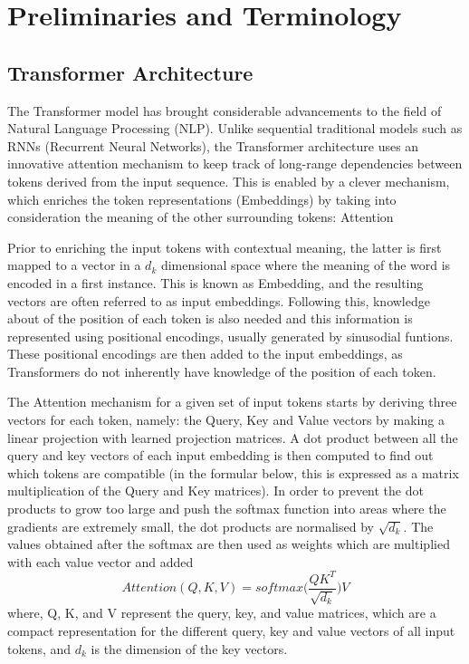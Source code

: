
\chapter{Preliminaries and Terminology}\label{chap:preliminaries-and-taxonomy}

\section{Transformer Architecture}

The Transformer model has brought considerable advancements to the field of Natural Language Processing (NLP). Unlike sequential traditional models such as RNNs (Recurrent Neural Networks), the Transformer architecture uses an innovative attention mechanism to keep track of long-range dependencies between tokens derived from the input sequence. This  is enabled by a clever mechanism, which enriches the token representations (Embeddings) by taking into consideration the meaning of the other surrounding tokens: Attention  ~\cite{vaswani2017attention}

Prior to enriching the input tokens with contextual meaning, the latter is first mapped to a vector in a ${d_k}$ dimensional space where the meaning of the word is encoded in a first instance. This is known as Embedding, and the resulting vectors are often referred to as input embeddings.  Following this, knowledge about of the position of each token is also needed and this information is represented using positional encodings, usually generated by sinusodial funtions. These positional encodings are then added to the input embeddings, as Transformers do not inherently have knowledge of the position of each token.

The Attention mechanism for a given set of input tokens starts by deriving three vectors for each token, namely: the Query, Key and Value vectors by making a linear projection with learned projection matrices. A dot product between all the query and key vectors of each input embedding is then computed to find out which tokens are compatible (in the formular below, this is expressed as a matrix multiplication of the Query and Key matrices). In order to prevent the dot products to grow too large and push the softmax function into areas where the gradients are extremely small, the dot products are normalised by $\sqrt{d_k}$. The values obtained after the softmax are then used as weights which are multiplied with each value vector and added 
\[ 
  Attention(Q,K,V) = softmax\bigg(\frac{QK^T}{\sqrt{d_k}}\bigg)V
\]
where, Q, K, and V represent the query, key, and value matrices, which are a compact representation for the different query, key and value vectors of all input tokens, and $d_k$ is the dimension of the key vectors.

